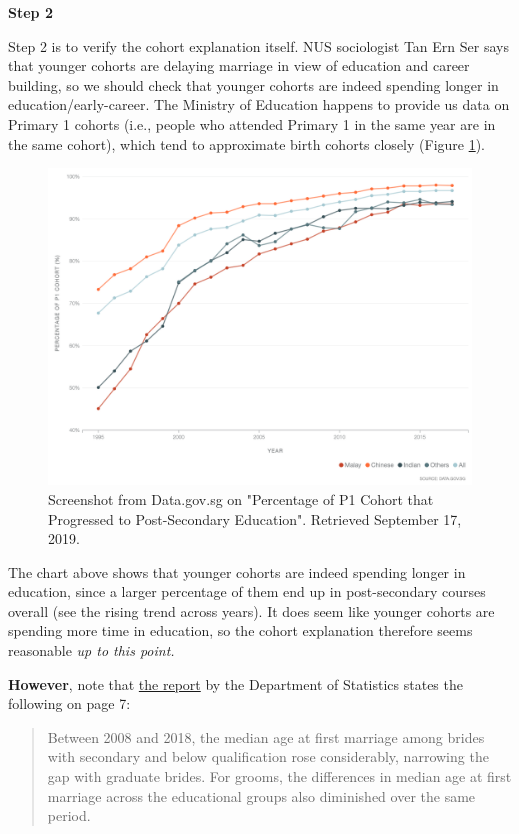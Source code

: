 \documentclass[
  openany]{book}
\begin{document}
\textbf{Step 2}

Step 2 is to verify the cohort explanation itself. NUS sociologist Tan Ern Ser says that younger cohorts are delaying marriage in view of education and career building, so we should check that younger cohorts are indeed spending longer in education/early-career. The Ministry of Education happens to provide us data on Primary 1 cohorts (i.e., people who attended Primary 1 in the same year are in the same cohort), which tend to approximate birth cohorts closely (Figure \ref{fig:apc-reportmoe}).

\begin{figure}

{\centering \includegraphics[width=0.8\linewidth]{images/apc/apc_moe} 

}

\caption{Screenshot from Data.gov.sg on "Percentage of P1 Cohort that Progressed to Post-Secondary Education". Retrieved September 17, 2019.}\label{fig:apc-reportmoe}
\end{figure}

The chart above shows that younger cohorts are indeed spending longer in education, since a larger percentage of them end up in post-secondary courses overall (see the rising trend across years). It does seem like younger cohorts are spending more time in education, so the cohort explanation therefore seems reasonable \emph{up to this point.}

\textbf{However}, note that \href{https://www.singstat.gov.sg/-/media/files/publications/population/smd2018.pdf}{the report} by the Department of Statistics states the following on page 7:

\begin{quote}
Between 2008 and 2018, the median age at first marriage among brides with secondary and below qualification rose considerably, narrowing the gap with graduate brides. For grooms, the differences in median age at first marriage across the educational groups also diminished over the same period.
\end{quote}
\end{document}
